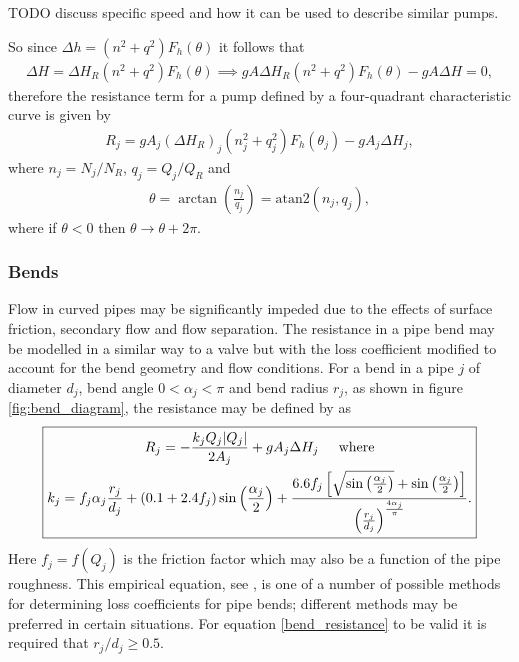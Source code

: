 \documentclass[12pt]{article}
\begin{document}
{\color{red} TODO discuss specific speed and how it can be used to describe similar pumps.}

{\color{green}
So since $\Delta h = \left(n^2 + q^2 \right) F_h(\theta)$ it follows that 
\begin{align}
\Delta H = \Delta H_R \left(n^2 + q^2 \right) F_h(\theta) \implies g A \Delta H_R \left(n^2 + q^2 \right) F_h(\theta) - g A \Delta H = 0,
\end{align}
therefore the resistance term for a pump defined by a four-quadrant characteristic curve is given by 
\begin{align}\label{pump_resistance}
\boxed{ R_j = g A_j \left( \Delta H_R \right)_j \left(n_j^2 + q_j^2 \right) F_h(\theta_j) - g A_j \Delta H_j, }
\end{align}
where $n_j = N_j / N_R$, $q_j = Q_j / Q_R$ and 
\begin{align*}
\theta = \arctan\left(\frac{n_j}{q_j} \right) = \text{atan2}(n_j, q_j),
\end{align*}
where if $\theta < 0$ then $\theta \rightarrow \theta + 2 \pi$. 
}

\subsubsection{Bends} 

Flow in curved pipes may be significantly impeded due to the effects of surface friction, secondary flow and flow separation. The resistance in a pipe bend may be modelled in a similar way to a valve but with the loss coefficient modified to account for the bend geometry and flow conditions. For a bend in a pipe $j$ of diameter $d_j$, bend angle $0 < \alpha_j < \pi$ and bend radius $r_j$, as shown in figure \ref{fig:bend_diagram}, the resistance may be defined by as
{ \color{green}
\begin{align}\label{bend_resistance}
\boxed{
  \!\begin{gathered}
  R_j = - \frac{k_j Q_j|Q_j| }{2 A_j} + g A_j \Delta H_j \hspace{0.5cm} \text{where}\\
  k_j = f_j \alpha_j \frac{r_j}{d_j}	 + (0.1 + 2.4 f_j) \sin \left( \frac{\alpha_j}{2} \right) + \frac{6.6 f_j \left[ \sqrt{\sin \left( \frac{\alpha_j}{2} \right) } + \sin \left( \frac{\alpha_j}{2} \right)  \right] }{\left(\frac{r_j}{d_j} \right)^{\frac{4 \alpha_j}{\pi}}}.
  \end{gathered}
}
\end{align}
Here $f_j = f(Q_j)$ is the friction factor which may also be a function of the pipe roughness. This empirical equation, see \cite{rennels22}, is one of a number of possible methods for determining loss coefficients for pipe bends; different methods may be preferred in certain situations. For equation \eqref{bend_resistance} to be valid it is required that $r_j / d_j \geq 0.5$.
}
\end{document}
